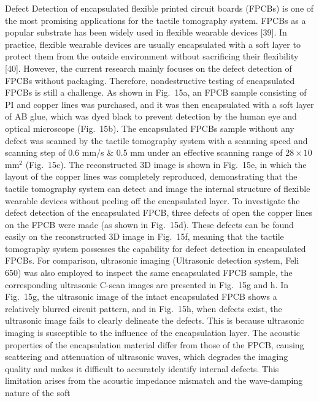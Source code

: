 \documentclass[11pt]{article}
\begin{document}
Defect Detection of encapsulated flexible printed circuit boards
(FPCBs) is one of the most promising applications for the tactile
tomography system. FPCBs as a popular substrate has been widely
used in flexible wearable devices [39]. In practice, flexible
wearable devices are usually encapsulated with a soft layer to
protect them from the outside environment without sacrificing
their flexibility [40]. However, the current research mainly
focuses on the defect detection of FPCBs without packaging.
Therefore, nondestructive testing of encapsulated FPCBs is still a
challenge. As shown in Fig.~15a, an FPCB sample consisting of PI
and copper lines was purchased, and it was then encapsulated with
a soft layer of AB glue, which was dyed black to prevent detection
by the human eye and optical microscope (Fig.~15b). The
encapsulated FPCBs sample without any defect was scanned by the
tactile tomography system with a scanning speed and scanning step
of 0.6 mm/s \& 0.5 mm under an effective scanning range of $28
\times 10$ mm$^2$ (Fig.~15c). The reconstructed 3D image is shown
in Fig.~15e, in which the layout of the copper lines was
completely reproduced, demonstrating that the tactile tomography
system can detect and image the internal structure of flexible
wearable devices without peeling off the encapsulated layer. To
investigate the defect detection of the encapsulated FPCB, three
defects of open the copper lines on the FPCB were made (as shown
in Fig.~15d). These defects can be found easily on the
reconstructed 3D image in Fig.~15f, meaning that the tactile
tomography system possesses the capability for defect detection in
encapsulated FPCBs. For comparison, ultrasonic imaging (Ultrasonic
detection system, Feli 650) was also employed to inspect the same
encapsulated FPCB sample, the corresponding ultrasonic C-scan
images are presented in Fig.~15g and h. In Fig.~15g, the
ultrasonic image of the intact encapsulated FPCB shows a
relatively blurred circuit pattern, and in Fig.~15h, when defects
exist, the ultrasonic image fails to clearly delineate the defects.
This is because ultrasonic imaging is susceptible to the influence
of the encapsulation layer. The acoustic properties of the
encapsulation material differ from those of the FPCB, causing
scattering and attenuation of ultrasonic waves, which degrades the
imaging quality and makes it difficult to accurately identify
internal defects. This limitation arises from the acoustic
impedance mismatch and the wave-damping nature of the soft

\newpage
\end{document}
